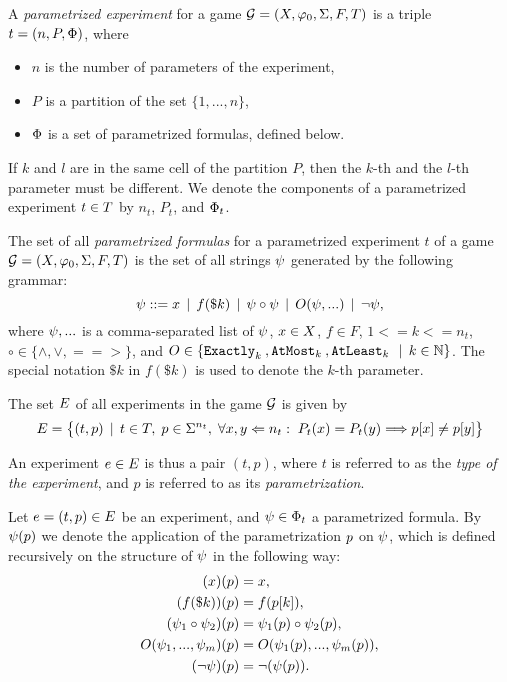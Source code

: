 \begin{definition} \label{def:game}
A \emph{parametrized experiment} for a game
  $\mathcal{G} = (X, \varphi_0, \Sigma, F, T)$
  is a triple
  $t = (n, P, \Phi)$, where
  \begin{itemize}
  \item $n$ is the number of parameters of the experiment,
  \item $P$ is a partition of the set $\{1, ..., n\}$,
  \item $\Phi$ is a set of parametrized formulas, defined below.
  \end{itemize}
If $k$ and $l$ are in the same cell of the partition $P$, then the $k$-th and
the $l$-th parameter must be different.
We denote the components of a parametrized experiment $t\in T$
  by $n_t$, $P_t$, and $\Phi_t$.
\end{definition}

\begin{definition} \label{def-pform}
The set of all \emph{parametrized formulas} for a parametrized experiment
$t$ of a game $\mathcal{G} = (X, \varphi_0, \Sigma, F, T)$
  is the set of
  all strings $\psi$ generated by the following grammar:
  $$ \psi ::= x \:\:|\:\: f(\$k) \:\:|\:\: \psi \circ \psi \:\:|\:\: O(\psi, ...)  \:\:|\:\: \neg \psi,$$
  where $\psi, ...$ is a comma-separated list of $\psi$, $x\in X$, $f\in F$, $1<= k <= n_t$,
  $\circ\in\{\wedge, \vee, ==>\}$, and $O\in\{ \mathtt{Exactly}_{k}\:, \mathtt{AtMost}_{k}\:, \mathtt{AtLeast}_{k}\: \:\:|\:\: k\in\mathbb{N}\}$.
The special notation $\$k$ in $f(\$k)$ is used to denote the $k$-th parameter.
\end{definition}

The set $E$ of all experiments in the game $\mathcal{G}$ is given by
\[
  E =
     \big\{ (t, p) \:\:|\:\: t\in T,\; p \in\Sigma^{n_t},\;
     \forall x,y<={n_t}:\; P_t(x)=P_t(y) ==> p[x] \not= p[y] \big\}
\]

An experiment $e\in E$ is thus a pair $(t, p)$, where
  $t$ is referred to as the \emph{type of the experiment},
 and $p$ is referred to as its \emph{parametrization}.

Let $e = (t, p)\in E$ be an experiment,
  and $\psi\in\Phi_t$ a parametrized formula.
By $\psi(p)$ we denote the application of
  the parametrization $p$ on $\psi$,
  which is defined recursively on the structure of $\psi$
  in the following way:
\begin{align}
(x)(p) &= x, \\
(f(\$k))(p) &= f(p[k]),\\
(\psi_1\circ\psi_2)(p) &= \psi_1(p) \circ \psi_2(p),\\
O(\psi_1, ..., \psi_m)(p) &= O(\psi_1(p), ..., \psi_m(p)),\\
(\neg\psi)(p) &= \neg(\psi(p)).
\end{align}

